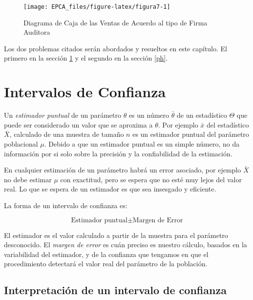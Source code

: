 \documentclass[letterpaper,]{book}
\begin{document}
\begin{figure}[h!]

{\centering \texttt{[image: EPCA\_files/figure-latex/figura7-1]} 

}

\caption{Diagrama de Caja de las Ventas de Acuerdo al tipo de Firma Auditora}\label{fig:figura7}
\end{figure}

Los dos problemas citados serán abordados y resueltos en este capítulo. El primero en la sección \ref{ic} y el segundo en la sección \ref{ph}.

\hypertarget{ic}{%
\section{Intervalos de Confianza}\label{ic}}

Un \emph{estimador puntual} de un parámetro \(\theta\) es un número \(\bar{\theta}\) de un estadístico \(\Theta\) que puede ser considerado un valor que se aproxima a \(\theta\). Por ejemplo \(\bar{x}\) del estadístico \(\bar{X}\), calculado de una muestra de tamaño \(n\) es un estimador puntual del parámetro poblacional \(\mu\). Debido a que un estimador puntual es un simple número, no da información por si solo sobre la precisión y la confiabilidad de la estimación.

En cualquier estimación de un parámetro habrá un error asociado, por ejemplo \(\bar{X}\) no debe estimar \(\mu\) con exactitud, pero se espera que no esté muy lejos del valor real. Lo que se espera de un estimador es que sea insesgado y eficiente.

La forma de un intervalo de confianza es:

\begin{equation} 
  \text{Estimador puntual} \pm \text{Margen de Error}
  \label{eq:ic}
\end{equation}

El estimador es el valor calculado a partir de la muestra para el parámetro desconocido. El \emph{margen de error} es cuán preciso es nuestro cálculo, basados en la variabilidad del estimador, y de la confianza que tengamos en que el procedimiento detectará el valor real del parámetro de la población.

\hypertarget{interpretacion-de-un-intervalo-de-confianza}{%
\subsection{Interpretación de un intervalo de confianza}\label{interpretacion-de-un-intervalo-de-confianza}}
\end{document}
